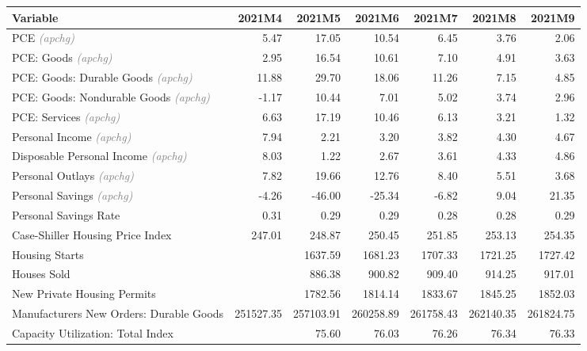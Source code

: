 \documentclass[11pt, letterpaper]{article}\usepackage[]{graphicx}\usepackage[]{color}
\begin{document}
\begin{table}[H]
\centering
\begingroup\fontsize{10pt}{12pt}\selectfont
\begin{tabular}{lrrrrrr}
  \hline
Variable & 2021M4 & 2021M5 & 2021M6 & 2021M7 & 2021M8 & 2021M9 \\ 
  \hline
PCE \textit{\footnotesize\textcolor{gray}{(apchg)}} & 5.47 & 17.05 & 10.54 & 6.45 & 3.76 & 2.06 \\ 
  PCE: Goods \textit{\footnotesize\textcolor{gray}{(apchg)}} & 2.95 & 16.54 & 10.61 & 7.10 & 4.91 & 3.63 \\ 
  PCE: Goods: Durable Goods \textit{\footnotesize\textcolor{gray}{(apchg)}} & 11.88 & 29.70 & 18.06 & 11.26 & 7.15 & 4.85 \\ 
  PCE: Goods: Nondurable Goods \textit{\footnotesize\textcolor{gray}{(apchg)}} & -1.17 & 10.44 & 7.01 & 5.02 & 3.74 & 2.96 \\ 
  PCE: Services \textit{\footnotesize\textcolor{gray}{(apchg)}} & 6.63 & 17.19 & 10.46 & 6.13 & 3.21 & 1.32 \\ 
  Personal Income \textit{\footnotesize\textcolor{gray}{(apchg)}} & 7.94 & 2.21 & 3.20 & 3.82 & 4.30 & 4.67 \\ 
  Disposable Personal Income \textit{\footnotesize\textcolor{gray}{(apchg)}} & 8.03 & 1.22 & 2.67 & 3.61 & 4.33 & 4.86 \\ 
  Personal Outlays \textit{\footnotesize\textcolor{gray}{(apchg)}} & 7.82 & 19.66 & 12.76 & 8.40 & 5.51 & 3.68 \\ 
  Personal Savings \textit{\footnotesize\textcolor{gray}{(apchg)}} & -4.26 & -46.00 & -25.34 & -6.82 & 9.04 & 21.35 \\ 
  Personal Savings Rate & 0.31 & 0.29 & 0.29 & 0.28 & 0.28 & 0.29 \\ 
  Case-Shiller Housing Price Index & 247.01 & 248.87 & 250.45 & 251.85 & 253.13 & 254.35 \\ 
  Housing Starts &  & 1637.59 & 1681.23 & 1707.33 & 1721.25 & 1727.42 \\ 
  Houses Sold &  & 886.38 & 900.82 & 909.40 & 914.25 & 917.01 \\ 
  New Private Housing Permits &  & 1782.56 & 1814.14 & 1833.67 & 1845.25 & 1852.03 \\ 
  Manufacturers New Orders: Durable Goods & 251527.35 & 257103.91 & 260258.89 & 261758.43 & 262140.35 & 261824.75 \\ 
  Capacity Utilization: Total Index &  & 75.60 & 76.03 & 76.26 & 76.34 & 76.33 \\ 

\end{tabular}
\end{table}
\end{document}
